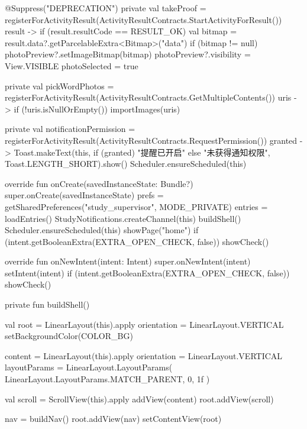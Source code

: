 {    @Suppress("DEPRECATION")
    private val takeProof = registerForActivityResult(ActivityResultContracts.StartActivityForResult()) { result ->
        if (result.resultCode == RESULT_OK) {
            val bitmap = result.data?.getParcelableExtra<Bitmap>("data")
            if (bitmap != null) {
                photoPreview?.setImageBitmap(bitmap)
                photoPreview?.visibility = View.VISIBLE
                photoSelected = true
            }
        }
    }

    private val pickWordPhotos =
        registerForActivityResult(ActivityResultContracts.GetMultipleContents()) { uris ->
            if (!uris.isNullOrEmpty()) importImages(uris)
        }

    private val notificationPermission =
        registerForActivityResult(ActivityResultContracts.RequestPermission()) { granted ->
            Toast.makeText(this, if (granted) "提醒已开启" else "未获得通知权限", Toast.LENGTH_SHORT).show()
            Scheduler.ensureScheduled(this)
        }

    override fun onCreate(savedInstanceState: Bundle?) {
        super.onCreate(savedInstanceState)
        prefs = getSharedPreferences("study_supervisor", MODE_PRIVATE)
        entries = loadEntries()
        StudyNotifications.createChannel(this)
        buildShell()
        Scheduler.ensureScheduled(this)
        showPage("home")
        if (intent.getBooleanExtra(EXTRA_OPEN_CHECK, false)) showCheck()
    }

    override fun onNewIntent(intent: Intent) {
        super.onNewIntent(intent)
        setIntent(intent)
        if (intent.getBooleanExtra(EXTRA_OPEN_CHECK, false)) showCheck()
    }

    private fun buildShell() {
        val root = LinearLayout(this).apply {
            orientation = LinearLayout.VERTICAL
            setBackgroundColor(COLOR_BG)
        }

        content = LinearLayout(this).apply {
            orientation = LinearLayout.VERTICAL
            layoutParams = LinearLayout.LayoutParams(
                LinearLayout.LayoutParams.MATCH_PARENT,
                0,
                1f
            )
        }

        val scroll = ScrollView(this).apply { addView(content) }
        root.addView(scroll)

        nav = buildNav()
        root.addView(nav)
        setContentView(root)
    }

}
